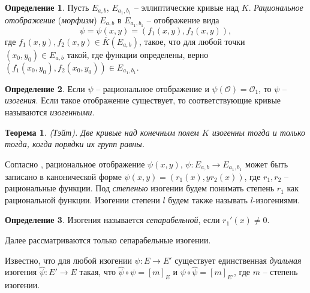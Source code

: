 \documentclass[a4paper,12pt]{article}
\newtheorem{theorem}{Теорема}
\theoremstyle{definition}
\newtheorem{definition}{Определение}
\begin{document}

\begin{definition}
Пусть $E_{a,b}$, $E_{a_1,b_1}$ -- эллиптические кривые над $K$. \emph{Рациональное отображение} (\emph{морфизм}) $E_{a,b}$ в $E_{a_1,b_1}$ -- отображение вида
$$
\psi=\psi(x,y)=(f_1(x,y),f_2(x,y)),
$$
где $f_1(x,y),f_2(x,y)\in\overline{K}(E_{a,b})$, такое, что для любой точки $(x_0,y_0)\in E_{a,b}$ такой, где функции определены,
верно $(f_1(x_0,y_0),f_2(x_0,y_0))\in E_{a_1,b_1}.$
\end{definition}


\begin{definition}
Если $\psi$ -- рациональное отображение и $\psi(\mathcal{O})=\mathcal{O}_1$, то $\psi$ -- \emph{изогения}.
Если такое отображение существует, то соответствующие кривые называются \emph{изогенными}.
\end{definition}

\begin{theorem} (Тэйт).
Две кривые над  конечным полем $K$ изогенны тогда и только тогда, когда порядки их групп равны.
\end{theorem}

Согласно \cite[2.9]{Wash}, рациональное отображение $\psi(x,y)$, $\psi:E_{a,b}\to E_{a_1,b_1}$ 
может быть записано в канонической форме $\psi(x,y)=(r_1(x),yr_2(x))$, где $r_1,r_2$ -- рациональные функции. Под \emph{степенью} изогении будем понимать степень $r_1$ как рациональной функции. Изогении степени $l$ будем также называть $l$-изогениями. 

\begin{definition}
Изогения называется \emph{сепарабельной}, если $r_1'(x)\neq 0$.
\end{definition}

Далее рассматриваются только сепарабельные изогении.

Известно, что  для любой  изогении $ \psi:E\to E'$   существует единственная \emph{дуальная} изогения $\hat{\psi}:E'\to E$ такая, что $\hat{\psi}\circ \psi=[m]_E$ и $\psi\circ\hat{\psi}=[m]_{E'}$, где $m$ -- {степень} изогении.
\end{document}
